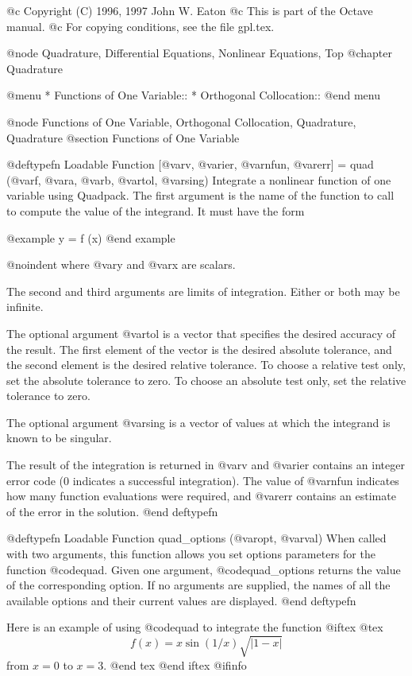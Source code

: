 @c Copyright (C) 1996, 1997 John W. Eaton
@c This is part of the Octave manual.
@c For copying conditions, see the file gpl.tex.

@node Quadrature, Differential Equations, Nonlinear Equations, Top
@chapter Quadrature

@menu
* Functions of One Variable::   
* Orthogonal Collocation::      
@end menu

@node Functions of One Variable, Orthogonal Collocation, Quadrature, Quadrature
@section Functions of One Variable

@deftypefn {Loadable Function} {[@var{v}, @var{ier}, @var{nfun}, @var{err}] =} quad (@var{f}, @var{a}, @var{b}, @var{tol}, @var{sing})
Integrate a nonlinear function of one variable using Quadpack.
The first argument is the name of the  function to call to compute the
value of the integrand.  It must have the form

@example
y = f (x)
@end example

@noindent
where @var{y} and @var{x} are scalars.

The second and third arguments are limits of integration.  Either or
both may be infinite.

The optional argument @var{tol} is a vector that specifies the desired
accuracy of the result.  The first element of the vector is the desired
absolute tolerance, and the second element is the desired relative
tolerance.  To choose a relative test only, set the absolute
tolerance to zero.  To choose an absolute test only, set the relative
tolerance to zero. 

The optional argument @var{sing} is a vector of values at which the
integrand is known to be singular.

The result of the integration is returned in @var{v} and @var{ier}
contains an integer error code (0 indicates a successful integration).
The value of @var{nfun} indicates how many function evaluations were
required, and @var{err} contains an estimate of the error in the
solution.
@end deftypefn

@deftypefn {Loadable Function} {} quad_options (@var{opt}, @var{val})
When called with two arguments, this function allows you set options
parameters for the function @code{quad}.  Given one argument,
@code{quad_options} returns the value of the corresponding option.  If
no arguments are supplied, the names of all the available options and
their current values are displayed.
@end deftypefn

Here is an example of using @code{quad} to integrate the function
@iftex
@tex
$$
 f(x) = x \sin (1/x) \sqrt {|1 - x|}
$$
from $x = 0$ to $x = 3$.
@end tex
@end iftex
@ifinfo

